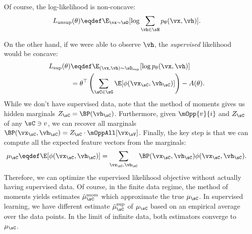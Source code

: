
Of course, the log-likelihood is non-concave:
\begin{align}
L_\text{unsup}(\theta) \eqdef \E_{\vx \sim \sD}[\log \sum_{\vh \in \sH} p_\theta(\vx,\vh)].
\end{align}

On the other hand, 
if we were able to observe $\vh$, the \emph{supervised} likelihood would be concave:
\begin{align}
\label{eqn:logLinearSupervised}
L_\text{sup}(\theta) &\eqdef \E_{(\vx,\vh) \sim \sD_\text{sup}}[\log p_\theta(\vx,\vh)] \\
                     &= \theta^\top \left(\sum_{\sC \in \sG} \E[\phi(\vx_\sC,\vh_\sC)]\right) - A(\theta).
\end{align}
While we don't have supervised data,
note that the method of moments gives us hidden marginals $Z_\sC = \BP(\vh_\sC)$.
Furthermore, given $\mOpp{v}{i}$ and $Z_\sC$ of any $\sC \ni v$, we can recover
all marginals $\BP(\vx_\sC, \vh_\sC) = Z_\sC \cdot \mOppAll[\vx_\sV]$.%
Finally, the key step is that we can compute all the expected feature vectors from the marginals:
\begin{align}
\label{eqn:logLinearFeatures}
\mu_\sC \eqdef \E[\phi(\vx_\sC,\vh_\sC)] = \sum_{\vx_\sC,\vh_\sC} \BP(\vx_\sC,\vh_\sC) \phi(\vx_\sC,\vh_\sC).
\end{align}
Therefore, we can optimize the supervised likelihood objective without actually
having supervised data.
Of course, in the finite data regime, the method of moments yields estimates
$\hat \mu^\text{mom}_\sC$ which approximate the true $\mu_\sC$.
In supervised learning, we have different estimate $\hat\mu^\text{sup}_\sC$ of $\mu_\sC$ based on an empirical average
over the data points.
In the limit of infinite data, both estimators converge to $\mu_\sC$.

